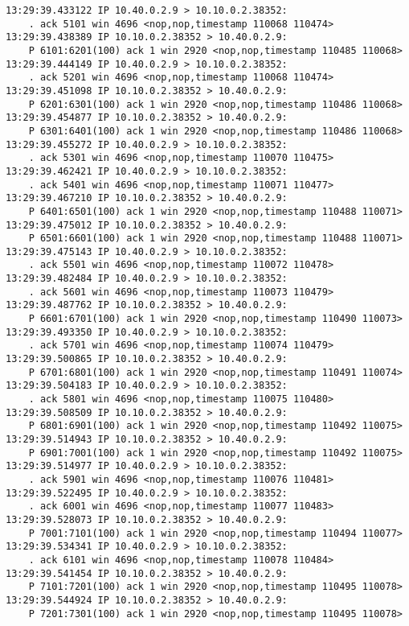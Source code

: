 \documentclass[a4paper,12pt]{article}
\begin{document}
\begin{Verbatim}
13:29:39.433122 IP 10.40.0.2.9 > 10.10.0.2.38352: 
    . ack 5101 win 4696 <nop,nop,timestamp 110068 110474>
13:29:39.438389 IP 10.10.0.2.38352 > 10.40.0.2.9: 
    P 6101:6201(100) ack 1 win 2920 <nop,nop,timestamp 110485 110068>
13:29:39.444149 IP 10.40.0.2.9 > 10.10.0.2.38352: 
    . ack 5201 win 4696 <nop,nop,timestamp 110068 110474>
13:29:39.451098 IP 10.10.0.2.38352 > 10.40.0.2.9: 
    P 6201:6301(100) ack 1 win 2920 <nop,nop,timestamp 110486 110068>
13:29:39.454877 IP 10.10.0.2.38352 > 10.40.0.2.9: 
    P 6301:6401(100) ack 1 win 2920 <nop,nop,timestamp 110486 110068>
13:29:39.455272 IP 10.40.0.2.9 > 10.10.0.2.38352: 
    . ack 5301 win 4696 <nop,nop,timestamp 110070 110475>
13:29:39.462421 IP 10.40.0.2.9 > 10.10.0.2.38352: 
    . ack 5401 win 4696 <nop,nop,timestamp 110071 110477>
13:29:39.467210 IP 10.10.0.2.38352 > 10.40.0.2.9: 
    P 6401:6501(100) ack 1 win 2920 <nop,nop,timestamp 110488 110071>
13:29:39.475012 IP 10.10.0.2.38352 > 10.40.0.2.9: 
    P 6501:6601(100) ack 1 win 2920 <nop,nop,timestamp 110488 110071>
13:29:39.475143 IP 10.40.0.2.9 > 10.10.0.2.38352: 
    . ack 5501 win 4696 <nop,nop,timestamp 110072 110478>
13:29:39.482484 IP 10.40.0.2.9 > 10.10.0.2.38352: 
    . ack 5601 win 4696 <nop,nop,timestamp 110073 110479>
13:29:39.487762 IP 10.10.0.2.38352 > 10.40.0.2.9: 
    P 6601:6701(100) ack 1 win 2920 <nop,nop,timestamp 110490 110073>
13:29:39.493350 IP 10.40.0.2.9 > 10.10.0.2.38352: 
    . ack 5701 win 4696 <nop,nop,timestamp 110074 110479>
13:29:39.500865 IP 10.10.0.2.38352 > 10.40.0.2.9: 
    P 6701:6801(100) ack 1 win 2920 <nop,nop,timestamp 110491 110074>
13:29:39.504183 IP 10.40.0.2.9 > 10.10.0.2.38352: 
    . ack 5801 win 4696 <nop,nop,timestamp 110075 110480>
13:29:39.508509 IP 10.10.0.2.38352 > 10.40.0.2.9: 
    P 6801:6901(100) ack 1 win 2920 <nop,nop,timestamp 110492 110075>
13:29:39.514943 IP 10.10.0.2.38352 > 10.40.0.2.9: 
    P 6901:7001(100) ack 1 win 2920 <nop,nop,timestamp 110492 110075>
13:29:39.514977 IP 10.40.0.2.9 > 10.10.0.2.38352: 
    . ack 5901 win 4696 <nop,nop,timestamp 110076 110481>
13:29:39.522495 IP 10.40.0.2.9 > 10.10.0.2.38352: 
    . ack 6001 win 4696 <nop,nop,timestamp 110077 110483>
13:29:39.528073 IP 10.10.0.2.38352 > 10.40.0.2.9: 
    P 7001:7101(100) ack 1 win 2920 <nop,nop,timestamp 110494 110077>
13:29:39.534341 IP 10.40.0.2.9 > 10.10.0.2.38352: 
    . ack 6101 win 4696 <nop,nop,timestamp 110078 110484>
13:29:39.541454 IP 10.10.0.2.38352 > 10.40.0.2.9: 
    P 7101:7201(100) ack 1 win 2920 <nop,nop,timestamp 110495 110078>
13:29:39.544924 IP 10.10.0.2.38352 > 10.40.0.2.9: 
    P 7201:7301(100) ack 1 win 2920 <nop,nop,timestamp 110495 110078>

\end{Verbatim}
\end{document}
